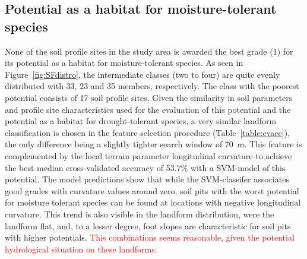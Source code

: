 \documentclass[soilsystems,article,submit,moreauthors,pdftex,10pt,a4paper]{Definitions/mdpi}
\begin{document}
\subsection{Potential as a habitat for moisture-tolerant species}
None of the soil profile sites in the study area is awarded the best grade (1) for its potential as a habitat for moisture-tolerant species. As seen in Figure~\ref{fig:SFdistro}, the intermediate classes (two to four) are quite evenly distributed with 33, 23 and 35 members, respectively. The class with the poorest potential consists of 17 soil profile sites.  Given the similarity in soil parameters and profile site characteristics used for the evaluation of this potential and the potential as a habitat for drought-tolerant species, a very similar landform classification is chosen in the feature selection procedure (Table~\ref{table:cvacc}), the only difference being a slightly tighter search window of 70~m. This feature is complemented by the local terrain parameter longitudinal curvature to achieve the best median cross-validated accuracy  of 53.7\% with a SVM-model of this potential. The model predictions show that while the SVM-classifer associates good grades with curvature values around zero, soil pits with the worst potential for moisture tolerant species can be found at locations with negative longitudinal curvature. This trend is also visible in the landform distribution, were the landform flat, and, to a lesser degree, foot slopes are characteristic for soil pits with higher potentials. \textcolor{red}{This combinations seems reasonable, given the potential hydrological situation on these landforms.}
\end{document}
